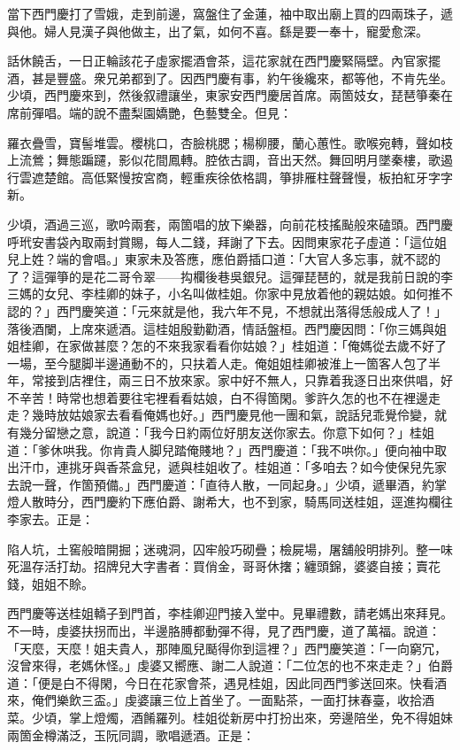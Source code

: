當下西門慶打了雪娥，走到前邊，窩盤住了金蓮，袖中取出廟上買的四兩珠子，遞與他。婦人見漢子與他做主，出了氣，如何不喜。繇是要一奉十，寵愛愈深。

話休饒舌，一日正輪該花子虛家擺酒會茶，這花家就在西門慶緊隔壁。內官家擺酒，甚是豐盛。衆兄弟都到了。因西門慶有事，約午後纔來，都等他，不肯先坐。少頃，西門慶來到，然後叙禮讓坐，東家安西門慶居首席。兩箇妓女，琵琶箏秦在席前彈唱。端的說不盡梨園嬌艷，色藝雙全。但見：

\begin{myquote}
羅衣疊雪，寶髻堆雲。櫻桃口，杏臉桃腮；楊柳腰，蘭心蕙性。歌喉宛轉，聲如枝上流鶯；舞態蹁躚，影似花間鳳轉。腔依古調，音出天然。舞回明月墜秦樓，歌遏行雲遮楚館。高低緊慢按宮商，輕重疾徐依格調，箏排雁柱聲聲慢，板拍紅牙字字新。
\end{myquote}

少頃，酒過三巡，歌吟兩套，兩箇唱的放下樂器，向前花枝搖颭般來磕頭。西門慶呼玳安書袋內取兩封賞賜，每人二錢，拜謝了下去。因問東家花子虛道：「這位姐兒上姓？端的會唱。」東家未及答應，應伯爵插口道：「大官人多忘事，就不認的了？這彈箏的是花二哥令翠——抅欄後巷吳銀兒。這彈琵琶的，就是我前日說的李三媽的女兒、李桂卿的妹子，小名叫做桂姐。你家中見放着他的親姑娘。如何推不認的？」西門慶笑道：「元來就是他，我六年不見，不想就出落得恁般成人了！」落後酒闌，上席來遞酒。這桂姐殷勤勸酒，情話盤桓。西門慶因問：「你三媽與姐姐桂卿，在家做甚麼？怎的不來我家看看你姑娘？」桂姐道：「俺媽從去歲不好了一場，至今腿脚半邊通動不的，只扶着人走。俺姐姐桂卿被淮上一箇客人包了半年，常接到店裡住，兩三日不放來家。家中好不無人，只靠着我逐日出來供唱，好不辛苦！時常也想着要往宅裡看看姑娘，白不得箇閑。爹許久怎的也不在裡邊走走？幾時放姑娘家去看看俺媽也好。」西門慶見他一團和氣，說話兒乖覺伶變，就有幾分留戀之意，說道：「我今日約兩位好朋友送你家去。你意下如何？」桂姐道：「爹休哄我。你肯貴人脚兒踏俺賤地？」{}西門慶道：「我不哄你。」便向袖中取出汗巾，連挑牙與香茶盒兒，遞與桂姐收了。桂姐道：「多咱去？如今使保兒先家去說一聲，作箇預備。」西門慶道：「直待人散，一同起身。」少頃，遞畢酒，約掌燈人散時分，西門慶約下應伯爵、謝希大，也不到家，騎馬同送桂姐，逕進抅欄往李家去。正是：

\begin{myquote}
陷人坑，土窖般暗開掘；迷魂洞，囚牢般巧砌疊；檢屍場，屠舖般明排列。整一味死溫存活打劫。招牌兒大字書者：買俏金，哥哥休撦；纏頭錦，婆婆自接；賣花錢，姐姐不賒。
\end{myquote}

西門慶等送桂姐轎子到門首，李桂卿迎門接入堂中。見畢禮數，請老媽出來拜見。不一時，虔婆扶拐而出，半邊胳膊都動彈不得，見了西門慶，道了萬福。說道：「天麼，天麼！姐夫貴人，那陣風兒颳得你到這裡？」西門慶笑道：「一向窮冗，沒曾來得，老媽休怪。」虔婆又嚮應、謝二人說道：「二位怎的也不來走走？」伯爵道：「便是白不得閑，今日在花家會茶，遇見桂姐，因此同西門爹送回來。快看酒來，俺們樂飲三盃。」虔婆讓三位上首坐了。一面點茶，一面打抹春臺，收拾酒菜。少頃，掌上燈燭，酒餚羅列。桂姐從新房中打扮出來，{}旁邊陪坐，免不得姐妹兩箇金樽滿泛，玉阮同調，歌唱遞酒。正是：

